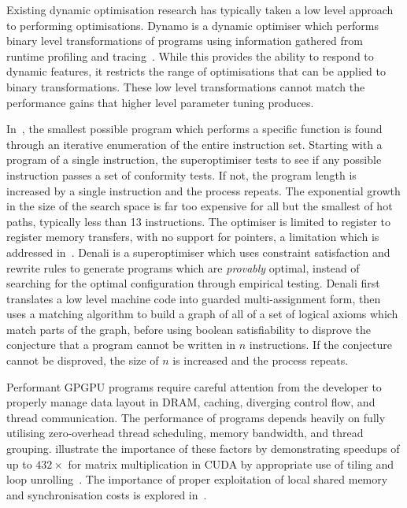 Existing dynamic optimisation research has typically taken a low level approach to performing optimisations. Dynamo is a dynamic optimiser which performs binary level transformations of programs using information gathered from runtime profiling and tracing~\cite{Bala2000}. While this provides the ability to respond to dynamic features, it restricts the range of optimisations that can be applied to binary transformations. These low level transformations cannot match the performance gains that higher level parameter tuning produces.

In~\cite{Massalin1987}, the smallest possible program which performs a specific function is found through an iterative enumeration of the entire instruction set. Starting with a program of a single instruction, the superoptimiser tests to see if any possible instruction passes a set of conformity tests. If not, the program length is increased by a single instruction and the process repeats. The exponential growth in the size of the search space is far too expensive for all but the smallest of hot paths, typically less than 13 instructions. The optimiser is limited to register to register memory transfers, with no support for pointers, a limitation which is addressed in~\cite{Joshi2002}. Denali is a superoptimiser which uses constraint satisfaction and rewrite rules to generate programs which are \emph{provably} optimal, instead of searching for the optimal configuration through empirical testing. Denali first translates a low level machine code into guarded multi-assignment form, then uses a matching algorithm to build a graph of all of a set of logical axioms which match parts of the graph, before using boolean satisfiability to disprove the conjecture that a program cannot be written in $n$ instructions. If the conjecture cannot be disproved, the size of $n$ is increased and the process repeats.

Performant GPGPU programs require careful attention from the developer to properly manage data layout in DRAM, caching, diverging control flow, and thread communication. The performance of programs depends heavily on fully utilising zero-overhead thread scheduling, memory bandwidth, and thread grouping. \citeauthor{Ryoo2008a} illustrate the importance of these factors by demonstrating speedups of up to $432\times$ for matrix multiplication in CUDA by appropriate use of tiling and loop unrolling~\cite{Ryoo2008a}. The importance of proper exploitation of local shared memory and synchronisation costs is explored in~\cite{Lee2010}.

